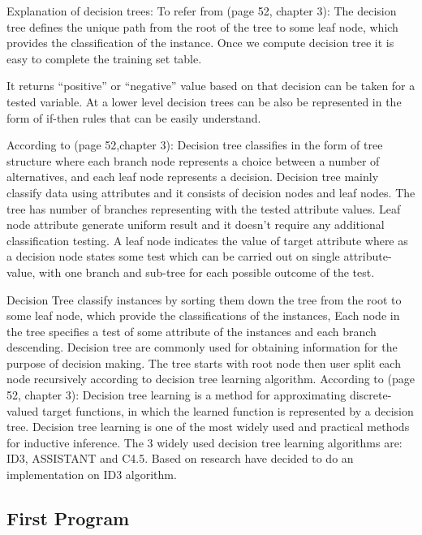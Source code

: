 \documentclass{report}
\begin{document}
Explanation of decision trees: To refer from \cite{Mitchell1997MachineLearning}(page 52, chapter 3): The decision tree defines the unique path from the root of the tree to some leaf node, which provides the classification of the instance. Once we compute decision tree it is easy to complete the training set table. 

It returns ``positive'' or ``negative'' value based on that decision can be taken for a tested variable. At a lower level decision trees can be also be represented in the form of if-then rules that can be easily understand.


According to \cite{Mitchell1997MachineLearning}(page 52,chapter 3): Decision tree classifies in the form of tree structure where each branch node represents a choice between a number of alternatives, and each leaf node represents a decision. Decision tree mainly classify data using attributes and it consists of decision nodes and leaf nodes. The tree has number of branches representing with the tested attribute values. Leaf node attribute generate uniform result and it doesn't require any additional classification testing. A leaf node indicates the value of target attribute where as a decision node states some test which can be carried out on single attribute-value, with one branch and sub-tree for each possible outcome of the test.

Decision Tree classify instances by sorting them down the tree from the root to some leaf node, which provide the classifications of the instances, Each node in the tree specifies a test of some attribute of the instances and each branch descending.
Decision tree are commonly used for obtaining information for the purpose of decision making. The tree starts with root node then user split each node recursively according to decision tree learning algorithm.
According to \cite{Mitchell1997MachineLearning}(page 52, chapter 3): Decision tree learning is a method for approximating discrete-valued target functions, in which the learned function is represented by a decision tree. Decision tree learning is one of the most widely used and practical methods for inductive inference. The 3 widely used decision tree learning algorithms are: ID3, ASSISTANT and C4.5. Based on research have decided to do an implementation on ID3 algorithm. 


\pagebreak

\subsection{First Program}
\label{sec:fp}
\end{document}
